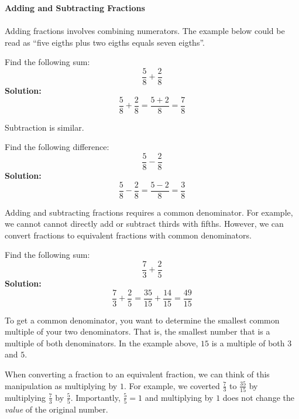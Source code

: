 \newpage 
\textbf{Adding and Subtracting Fractions}
\\ \\
Adding fractions involves combining numerators.   The example below could be read as ``five eigths plus two eigths equals seven eigths''.  
\begin{example}
	Find the following sum:
	\[\frac{5}{8}+\frac{2}{8}\]
\textbf{Solution:}
	\[\frac{5}{8}+\frac{2}{8} = \frac{5+2}{8} =  \frac{7}{8}\]
\end{example}
Subtraction is similar. 
\begin{example}
	Find the following difference:
	\[\frac{5}{8}-\frac{2}{8}\]
\textbf{Solution:}
	\[\frac{5}{8}-\frac{2}{8} = \frac{5-2}{8} = \frac{3}{8}\]
\end{example}
Adding and subtracting fractions requires a common denominator.  For example, we cannot cannot directly add or subtract thirds with fifths.  However, we can convert fractions to equivalent fractions with common denominators.  
\begin{example}
	Find the following sum: 
	\[\frac{7}{3} + \frac{2}{5}\]
\textbf{Solution:}
	\[\frac{7}{3} + \frac{2}{5} = \frac{35}{15} + \frac{14}{15} = \frac{49}{15} \]
\end{example}
To get a common denominator, you want to determine the smallest common multiple of your two denominators.  That is, the smallest number that is a multiple of both denominators.  In the example above, \(15\) is a multiple of both \(3\) and \(5\).  
\begin{remark}
 	When converting a fraction to an equivalent fraction, we can think of this manipulation as multiplying by \(1\).  For example, we coverted \(\frac{7}{3}\) to \(\frac{35}{15}\) by multiplying \(\frac{7}{3}\) by \(\frac{5}{5}\).  Importantly, \(\frac{5}{5} = 1\)  and multiplying by \(1\) does not change the \emph{value} of the original number. 
\end{remark}



\newpage 


